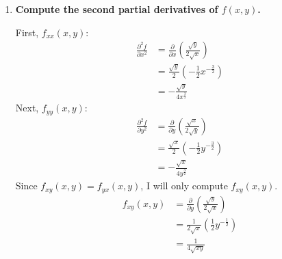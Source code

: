 \documentclass[11pt]{article}
\begin{document}
\begin{enumerate}[label=\textbf{\arabic*.}]
{\begin{enumerate}[label=\textbf{(\alph*)}]
{                    With respect to \(x\):
                    \begin{align*}
                        \frac{\partial f}{\partial x}&=\sqrt y\left(\frac{1}{2}x^{-\frac{1}{2}}\right) \\
                        &=\frac{\sqrt y}{2\sqrt x}
                    \end{align*}
                    And with respect to \(y\):
                    \begin{align*}
                        \frac{\partial f}{\partial y}&=\sqrt x\left(\frac{1}{2}y^{-\frac{1}{2}}\right) \\
                        &=\frac{\sqrt x}{2\sqrt y}
                    \end{align*}
                }
                \item{
                    \textbf{\boldmath Compute the second partial derivatives of \(f(x,y)\).}
                    \par
                    First, \(f_{xx}(x,y)\):
                    \begin{align*}
                        \frac{\partial^2f}{\partial x^2}&=\frac{\partial}{\partial x}\left(\frac{\sqrt y}{2\sqrt x}\right) \\
                        &=\frac{\sqrt y}{2}\left(-\frac{1}{2}x^{-\frac{3}{2}}\right) \\
                        &=-\frac{\sqrt y}{4x^{\frac{3}{2}}}
                    \end{align*}
                    Next, \(f_{yy}(x,y)\):
                    \begin{align*}
                        \frac{\partial^2f}{\partial y^2}&=\frac{\partial}{\partial y}\left(\frac{\sqrt x}{2\sqrt y}\right) \\
                        &=\frac{\sqrt x}{2}\left(-\frac{1}{2}y^{-\frac{3}{2}}\right) \\
                        &=-\frac{\sqrt x}{4y^{\frac{3}{2}}}
                    \end{align*}
                    Since \(f_{xy}(x,y)=f_{yx}(x,y)\), I will only compute \(f_{xy}(x,y)\).
                    \begin{align*}
                        f_{xy}(x,y)&=\frac{\partial}{\partial y}\left(\frac{\sqrt y}{2\sqrt x}\right) \\
                        &=\frac{1}{2\sqrt x}\left(\frac{1}{2}y^{-\frac{1}{2}}\right) \\
                        &=\frac{1}{4\sqrt{xy}}
                    \end{align*}
}
\end{enumerate}}
\end{enumerate}
\end{document}
